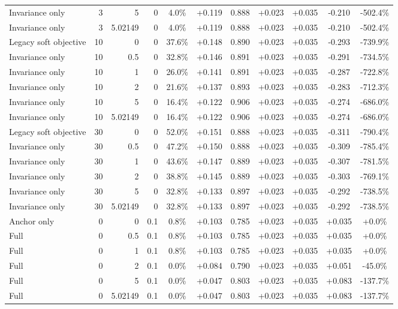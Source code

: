 \begin{table}[htbp]
\begin{tabular}{lrrrccccccc}
Invariance only & 3 & 5 & 0 & 4.0\% & +0.119 & 0.888 & +0.023 & +0.035 & -0.210 & -502.4\% \\
Invariance only & 3 & 5.02149 & 0 & 4.0\% & +0.119 & 0.888 & +0.023 & +0.035 & -0.210 & -502.4\% \\
Legacy soft objective & 10 & 0 & 0 & 37.6\% & +0.148 & 0.890 & +0.023 & +0.035 & -0.293 & -739.9\% \\
Invariance only & 10 & 0.5 & 0 & 32.8\% & +0.146 & 0.891 & +0.023 & +0.035 & -0.291 & -734.5\% \\
Invariance only & 10 & 1 & 0 & 26.0\% & +0.141 & 0.891 & +0.023 & +0.035 & -0.287 & -722.8\% \\
Invariance only & 10 & 2 & 0 & 21.6\% & +0.137 & 0.893 & +0.023 & +0.035 & -0.283 & -712.3\% \\
Invariance only & 10 & 5 & 0 & 16.4\% & +0.122 & 0.906 & +0.023 & +0.035 & -0.274 & -686.0\% \\
Invariance only & 10 & 5.02149 & 0 & 16.4\% & +0.122 & 0.906 & +0.023 & +0.035 & -0.274 & -686.0\% \\
Legacy soft objective & 30 & 0 & 0 & 52.0\% & +0.151 & 0.888 & +0.023 & +0.035 & -0.311 & -790.4\% \\
Invariance only & 30 & 0.5 & 0 & 47.2\% & +0.150 & 0.888 & +0.023 & +0.035 & -0.309 & -785.4\% \\
Invariance only & 30 & 1 & 0 & 43.6\% & +0.147 & 0.889 & +0.023 & +0.035 & -0.307 & -781.5\% \\
Invariance only & 30 & 2 & 0 & 38.8\% & +0.145 & 0.889 & +0.023 & +0.035 & -0.303 & -769.1\% \\
Invariance only & 30 & 5 & 0 & 32.8\% & +0.133 & 0.897 & +0.023 & +0.035 & -0.292 & -738.5\% \\
Invariance only & 30 & 5.02149 & 0 & 32.8\% & +0.133 & 0.897 & +0.023 & +0.035 & -0.292 & -738.5\% \\
Anchor only & 0 & 0 & 0.1 & 0.8\% & +0.103 & 0.785 & +0.023 & +0.035 & +0.035 & +0.0\% \\
Full & 0 & 0.5 & 0.1 & 0.8\% & +0.103 & 0.785 & +0.023 & +0.035 & +0.035 & +0.0\% \\
Full & 0 & 1 & 0.1 & 0.8\% & +0.103 & 0.785 & +0.023 & +0.035 & +0.035 & +0.0\% \\
Full & 0 & 2 & 0.1 & 0.0\% & +0.084 & 0.790 & +0.023 & +0.035 & +0.051 & -45.0\% \\
Full & 0 & 5 & 0.1 & 0.0\% & +0.047 & 0.803 & +0.023 & +0.035 & +0.083 & -137.7\% \\
Full & 0 & 5.02149 & 0.1 & 0.0\% & +0.047 & 0.803 & +0.023 & +0.035 & +0.083 & -137.7\% \\

\end{tabular}
\end{table}

